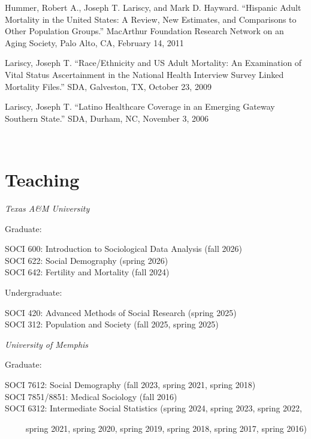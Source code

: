 \documentclass[11pt,]{article}
\begin{document}
Hummer, Robert A., Joseph T. Lariscy, and Mark D. Hayward. ``Hispanic
Adult Mortality in the United States: A Review, New Estimates, and
Comparisons to Other Population Groups.'' MacArthur Foundation Research
Network on an Aging Society, Palo Alto, CA, February 14, 2011

Lariscy, Joseph T. ``Race/Ethnicity and US Adult Mortality: An
Examination of Vital Status Ascertainment in the National Health
Interview Survey Linked Mortality Files.'' SDA, Galveston, TX, October
23, 2009

Lariscy, Joseph T. ``Latino Healthcare Coverage in an Emerging Gateway
Southern State.'' SDA, Durham, NC, November 3, 2006

~

\section{Teaching}\label{teaching}

\emph{Texas A\&M University}

\setlength{\leftskip}{0.5cm}

Graduate:

\setlength{\leftskip}{0cm}
\setlength{\leftskip}{1cm}

SOCI 600: Introduction to Sociological Data Analysis (fall 2026)\\
SOCI 622: Social Demography (spring 2026)\\
SOCI 642: Fertility and Mortality (fall 2024)

\setlength{\leftskip}{0cm}

\setlength{\leftskip}{0.5cm}

Undergraduate:

\setlength{\leftskip}{0cm}
\setlength{\leftskip}{1cm}

SOCI 420: Advanced Methods of Social Research (spring 2025)\\
SOCI 312: Population and Society (fall 2025, spring 2025)

\setlength{\leftskip}{0cm}

\emph{University of Memphis}

\setlength{\leftskip}{0.5cm}

Graduate:

\setlength{\leftskip}{0cm}
\setlength{\leftskip}{1cm}

SOCI 7612: Social Demography (fall 2023, spring 2021, spring 2018)\\
SOCI 7851/8851: Medical Sociology (fall 2016)\\
SOCI 6312: Intermediate Social Statistics (spring 2024, spring 2023,
spring 2022,\\
\strut ~~~~~spring 2021, spring 2020, spring 2019, spring 2018, spring
2017, spring 2016)
\end{document}
